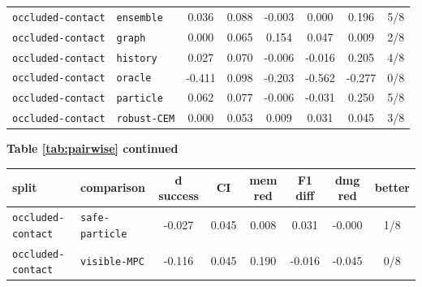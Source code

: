\documentclass{article}
\begin{document}
\begin{center}
\begin{tabular}{llcccccc}
\texttt{occluded-contact} & \texttt{ensemble} & 0.036 & 0.088 & -0.003 & 0.000 & 0.196 & 5/8 \\
\texttt{occluded-contact} & \texttt{graph} & 0.000 & 0.065 & 0.154 & 0.047 & 0.009 & 2/8 \\
\texttt{occluded-contact} & \texttt{history} & 0.027 & 0.070 & -0.006 & -0.016 & 0.205 & 4/8 \\
\texttt{occluded-contact} & \texttt{oracle} & -0.411 & 0.098 & -0.203 & -0.562 & -0.277 & 0/8 \\
\texttt{occluded-contact} & \texttt{particle} & 0.062 & 0.077 & -0.006 & -0.031 & 0.250 & 5/8 \\
\texttt{occluded-contact} & \texttt{robust-CEM} & 0.000 & 0.053 & 0.009 & 0.031 & 0.045 & 3/8 \\
\bottomrule
\end{tabular}
\end{center}
\begin{center}
\textbf{Table \ref{tab:pairwise} continued}\\[0.4ex]
\begin{tabular}{llcccccc}
\toprule
split & comparison & d success & CI & mem red & F1 diff & dmg red & better \\
\midrule
\texttt{occluded-contact} & \texttt{safe-particle} & -0.027 & 0.045 & 0.008 & 0.031 & -0.000 & 1/8 \\
\texttt{occluded-contact} & \texttt{visible-MPC} & -0.116 & 0.045 & 0.190 & -0.016 & -0.045 & 0/8 \\
\bottomrule
\end{tabular}
\end{center}
\normalsize
\end{document}
